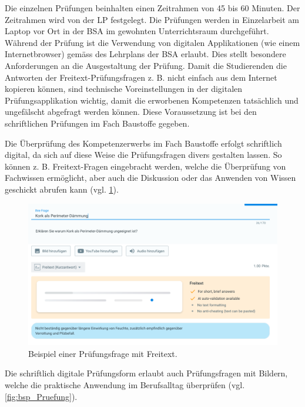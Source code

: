 \documentclass[
11pt,
captions=tableheading,
smallheadings,
headsepline,
footsepline, 
parskip=half-,
]{scrartcl}
\begin{document}
Die einzelnen Prüfungen beinhalten einen Zeitrahmen von 45 bis 60 Minuten. Der Zeitrahmen wird von der LP festgelegt. Die Prüfungen werden in Einzelarbeit am Laptop vor Ort in der BSA im gewohnten Unterrichtsraum durchgeführt. Während der Prüfung ist die Verwendung von digitalen Applikationen (wie einem Internetbrowser) gemäss des Lehrplans der BSA erlaubt. Dies stellt besondere Anforderungen an die Ausgestaltung der Prüfung. Damit die Studierenden die Antworten der Freitext-Prüfungsfragen z. B. nicht einfach aus dem Internet kopieren können, sind technische Voreinstellungen in der digitalen Prüfungsapplikation wichtig, damit die erworbenen Kompetenzen tatsächlich und ungefälscht abgefragt werden können. Diese Voraussetzung ist bei den schriftlichen Prüfungen im Fach Baustoffe gegeben. 

Die Überprüfung des Kompetenzerwerbs im Fach Baustoffe erfolgt schriftlich digital, da sich auf diese Weise die Prüfungsfragen divers gestalten lassen. So können z. B. Freitext-Fragen eingebracht werden, welche die Überprüfung von Fachwissen ermöglicht, aber auch die Diskussion oder das Anwenden von Wissen geschickt abrufen kann (vgl. \cref{fig:bsp_Pruefung_freitext}).

\begin{figure}[h!bt]
    \centering
    \includegraphics[width=0.7\linewidth]{Bilder/Bsp_Freitextfrage.png}
    \caption{Beispiel einer Prüfungsfrage mit Freitext.}
    \label{fig:bsp_Pruefung_freitext}
\end{figure}






Die schriftlich digitale Prüfungsform erlaubt auch Prüfungsfragen mit Bildern, welche die praktische Anwendung im Berufsalltag überprüfen (vgl. \cref{fig:bsp_Pruefung}).
\end{document}
